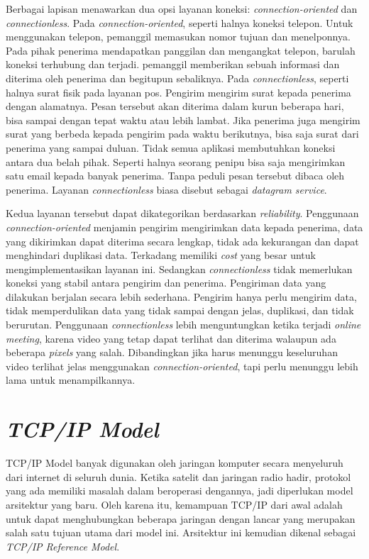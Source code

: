 Berbagai lapisan menawarkan dua opsi layanan koneksi: \emph{connection-oriented} dan \emph{connectionless}. Pada \emph{connection-oriented}, seperti halnya koneksi telepon. Untuk menggunakan telepon, pemanggil memasukan nomor tujuan dan menelponnya. Pada pihak penerima mendapatkan panggilan dan mengangkat telepon, barulah koneksi terhubung dan terjadi. pemanggil memberikan sebuah informasi dan diterima oleh penerima dan begitupun sebaliknya. Pada \emph{connectionless}, seperti halnya surat fisik pada layanan pos. Pengirim mengirim surat kepada penerima dengan alamatnya. Pesan tersebut akan diterima dalam kurun beberapa hari, bisa sampai dengan tepat waktu atau lebih lambat. Jika penerima juga mengirim surat yang berbeda kepada pengirim pada waktu berikutnya, bisa saja surat dari penerima yang sampai duluan. Tidak semua aplikasi membutuhkan koneksi antara dua belah pihak. Seperti halnya seorang penipu bisa saja mengirimkan satu email kepada banyak penerima. Tanpa peduli pesan tersebut dibaca oleh penerima. Layanan \emph{connectionless} biasa disebut sebagai \emph{datagram service}.

Kedua layanan tersebut dapat dikategorikan berdasarkan \emph{reliability}. Penggunaan \emph{connection-oriented} menjamin pengirim mengirimkan data kepada penerima, data yang dikirimkan dapat diterima secara lengkap, tidak ada kekurangan dan dapat menghindari duplikasi data. Terkadang memiliki \emph{cost} yang besar untuk mengimplementasikan layanan ini. Sedangkan \emph{connectionless} tidak memerlukan koneksi yang stabil antara pengirim dan penerima. Pengiriman data yang dilakukan berjalan secara lebih sederhana. Pengirim hanya perlu mengirim data, tidak memperdulikan data yang tidak sampai dengan jelas, duplikasi, dan tidak berurutan. Penggunaan \emph{connectionless} lebih menguntungkan ketika terjadi \emph{online meeting}, karena video yang tetap dapat terlihat dan diterima walaupun ada beberapa \emph{pixels} yang salah. Dibandingkan jika harus menunggu keseluruhan video terlihat jelas menggunakan \emph{connection-oriented}, tapi perlu menunggu lebih lama untuk menampilkannya.


\section{\emph{TCP/IP Model}}

TCP/IP Model banyak digunakan oleh jaringan komputer secara menyeluruh dari internet di seluruh dunia. Ketika satelit dan jaringan radio hadir, protokol yang ada memiliki masalah dalam beroperasi dengannya, jadi diperlukan model arsitektur yang baru. Oleh karena itu, kemampuan TCP/IP dari awal adalah untuk dapat menghubungkan beberapa jaringan dengan lancar yang merupakan salah satu tujuan utama dari model ini. Arsitektur ini kemudian dikenal sebagai \emph{TCP/IP Reference Model}.

